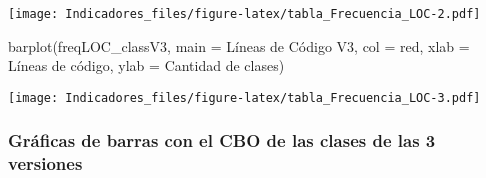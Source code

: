 \documentclass[
]{article}
\newenvironment{Shaded}{\begin{snugshade}}{\end{snugshade}}
\newcommand{\AttributeTok}[1]{\textcolor[rgb]{0.77,0.63,0.00}{#1}}
\newcommand{\FunctionTok}[1]{\textcolor[rgb]{0.00,0.00,0.00}{#1}}
\newcommand{\NormalTok}[1]{#1}
\newcommand{\StringTok}[1]{\textcolor[rgb]{0.31,0.60,0.02}{#1}}
\begin{document}
\texttt{[image: Indicadores\_files/figure-latex/tabla\_Frecuencia\_LOC-2.pdf]}

\begin{Shaded}
\begin{Highlighting}[]
\FunctionTok{barplot}\NormalTok{(freqLOC\_classV3,}
        \AttributeTok{main =} \StringTok{\textquotesingle{}Líneas de Código V3\textquotesingle{}}\NormalTok{,}
        \AttributeTok{col =} \StringTok{\textquotesingle{}red\textquotesingle{}}\NormalTok{,}
        \AttributeTok{xlab =} \StringTok{\textquotesingle{}Líneas de código\textquotesingle{}}\NormalTok{,}
        \AttributeTok{ylab =} \StringTok{\textquotesingle{}Cantidad de clases\textquotesingle{}}\NormalTok{)}
\end{Highlighting}
\end{Shaded}

\texttt{[image: Indicadores\_files/figure-latex/tabla\_Frecuencia\_LOC-3.pdf]}

\hypertarget{gruxe1ficas-de-barras-con-el-cbo-de-las-clases-de-las-3-versiones}{%
\subsubsection{Gráficas de barras con el CBO de las clases de las 3
versiones}\label{gruxe1ficas-de-barras-con-el-cbo-de-las-clases-de-las-3-versiones}}
\end{document}
